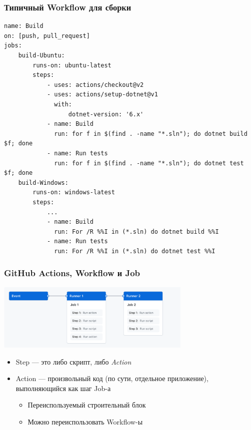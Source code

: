 \documentclass{../../slides-style}
\begin{document}
    \begin{frame}[fragile]
        \frametitle{Типичный Workflow для сборки}
        \begin{scriptsize}
            \begin{verbatim}
name: Build
on: [push, pull_request]
jobs:
    build-Ubuntu:
        runs-on: ubuntu-latest
        steps:
            - uses: actions/checkout@v2
            - uses: actions/setup-dotnet@v1
              with:
                  dotnet-version: '6.x'
            - name: Build
              run: for f in $(find . -name "*.sln"); do dotnet build $f; done
            - name: Run tests
              run: for f in $(find . -name "*.sln"); do dotnet test $f; done
    build-Windows:
        runs-on: windows-latest
        steps:
            ...
            - name: Build
              run: For /R %%I in (*.sln) do dotnet build %%I
            - name: Run tests
              run: For /R %%I in (*.sln) do dotnet test %%I
            \end{verbatim}
        \end{scriptsize}
    \end{frame}

    \begin{frame}
        \frametitle{GitHub Actions, Workflow и Job}
        \begin{center}
            \includegraphics[width=0.7\textwidth]{githubActionsWorkflow}
        \end{center}
        \begin{itemize}
            \item Step --- это либо скрипт, либо \emph{Action}
            \item Action --- произвольный код (по сути, отдельное приложение), выполняющийся как шаг Job-а
            \begin{itemize}
                \item Переиспользуемый строительный блок
                \item Можно переиспользовать Workflow-ы
            \end{itemize}
        \end{itemize}
    \end{frame}
\end{document}
